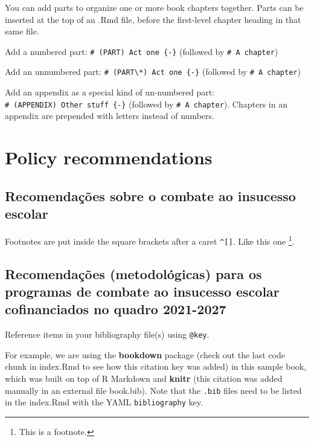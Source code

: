 \documentclass[
]{book}
\theoremstyle{definition}
\theoremstyle{definition}
\theoremstyle{definition}
\theoremstyle{definition}
\theoremstyle{remark}
\begin{document}
You can add parts to organize one or more book chapters together. Parts can be inserted at the top of an .Rmd file, before the first-level chapter heading in that same file.

Add a numbered part: \texttt{\#\ (PART)\ Act\ one\ \{-\}} (followed by \texttt{\#\ A\ chapter})

Add an unnumbered part: \texttt{\#\ (PART\textbackslash{}*)\ Act\ one\ \{-\}} (followed by \texttt{\#\ A\ chapter})

Add an appendix as a special kind of un-numbered part: \texttt{\#\ (APPENDIX)\ Other\ stuff\ \{-\}} (followed by \texttt{\#\ A\ chapter}). Chapters in an appendix are prepended with letters instead of numbers.

\hypertarget{policy-recommendations}{%
\chapter{Policy recommendations}\label{policy-recommendations}}

\hypertarget{recomendauxe7uxf5es-sobre-o-combate-ao-insucesso-escolar}{%
\section{Recomendações sobre o combate ao insucesso escolar}\label{recomendauxe7uxf5es-sobre-o-combate-ao-insucesso-escolar}}

Footnotes are put inside the square brackets after a caret \texttt{\^{}{[}{]}}. Like this one \footnote{This is a footnote.}.

\hypertarget{recomendauxe7uxf5es-metodoluxf3gicas-para-os-programas-de-combate-ao-insucesso-escolar-cofinanciados-no-quadro-2021-2027}{%
\section{Recomendações (metodológicas) para os programas de combate ao insucesso escolar cofinanciados no quadro 2021-2027}\label{recomendauxe7uxf5es-metodoluxf3gicas-para-os-programas-de-combate-ao-insucesso-escolar-cofinanciados-no-quadro-2021-2027}}

Reference items in your bibliography file(s) using \texttt{@key}.

For example, we are using the \textbf{bookdown} package \citep{R-bookdown} (check out the last code chunk in index.Rmd to see how this citation key was added) in this sample book, which was built on top of R Markdown and \textbf{knitr} \citep{xie2015} (this citation was added manually in an external file book.bib).
Note that the \texttt{.bib} files need to be listed in the index.Rmd with the YAML \texttt{bibliography} key.
\end{document}
